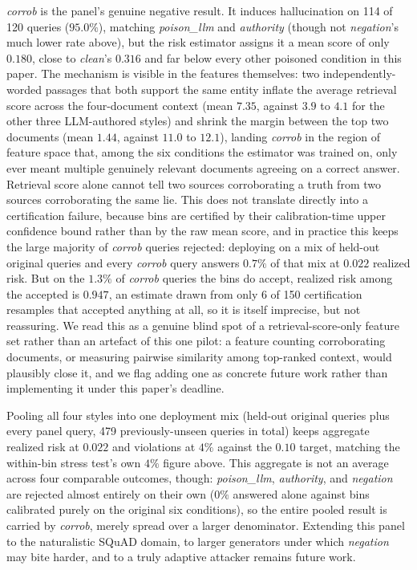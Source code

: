 \documentclass[sn-basic]{sn-jnl}
\theoremstyle{thmstyleone}
\theoremstyle{thmstyletwo}
\begin{document}
\emph{corrob} is the panel's genuine negative result. It induces
hallucination on 114 of 120 queries ($95.0\%$), matching
\emph{poison\_llm} and \emph{authority} (though not \emph{negation}'s
much lower rate above), but the risk estimator assigns it a mean score of
only $0.180$, close to \emph{clean}'s $0.316$ and far below every other
poisoned condition in this paper. The mechanism is visible in the
features themselves: two independently-worded passages that both
support the same entity inflate the average retrieval score across the
four-document context (mean $7.35$, against $3.9$ to $4.1$ for the
other three LLM-authored styles) and shrink the margin between the top
two documents (mean $1.44$, against $11.0$ to $12.1$), landing
\emph{corrob} in the region of feature space that, among the six
conditions the estimator was trained on, only ever meant multiple
genuinely relevant documents agreeing on a correct answer. Retrieval
score alone cannot tell two sources corroborating a truth from two
sources corroborating the same lie. This does not translate directly
into a certification failure, because bins are certified by their
calibration-time upper confidence bound rather than by the raw mean
score, and in practice this keeps the large majority of \emph{corrob}
queries rejected: deploying on a mix of held-out original queries and
every \emph{corrob} query answers $0.7\%$ of that mix at $0.022$
realized risk. But on the $1.3\%$ of \emph{corrob} queries the bins do
accept, realized risk among the accepted is $0.947$, an estimate drawn
from only 6 of 150 certification resamples that accepted anything at
all, so it is itself imprecise, but not reassuring. We read this as a
genuine blind spot of a retrieval-score-only feature set rather than an
artefact of this one pilot: a feature counting corroborating documents,
or measuring pairwise similarity among top-ranked context, would
plausibly close it, and we flag adding one as concrete future work
rather than implementing it under this paper's deadline.

Pooling all four styles into one deployment mix (held-out original
queries plus every panel query, 479 previously-unseen queries in
total) keeps aggregate realized risk at $0.022$ and violations at
$4\%$ against the $0.10$ target, matching the within-bin stress test's
own $4\%$ figure above. This aggregate is not an average across four
comparable outcomes, though: \emph{poison\_llm}, \emph{authority}, and
\emph{negation} are rejected almost entirely on their own ($0\%$
answered alone against bins calibrated purely on the original six
conditions), so the entire pooled result is carried by \emph{corrob},
merely spread over a larger denominator. Extending this panel to the
naturalistic SQuAD domain, to larger generators under which
\emph{negation} may bite harder, and to a truly adaptive attacker
remains future work.
\end{document}
